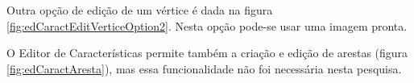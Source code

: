 Outra opção de edição de um vértice é dada na figura \ref{fig:edCaractEditVerticeOption2}. Nesta opção pode-se usar uma imagem pronta.
\begin{figure}[!ht]
	\centering	
\end{figure}
\FloatBarrier

O Editor de Características permite também a criação e edição de arestas (figura \ref{fig:edCaractAresta}), mas essa funcionalidade não foi necessária nesta pesquisa.
\begin{figure}[!ht]
	\centering	
\end{figure}
\FloatBarrier

